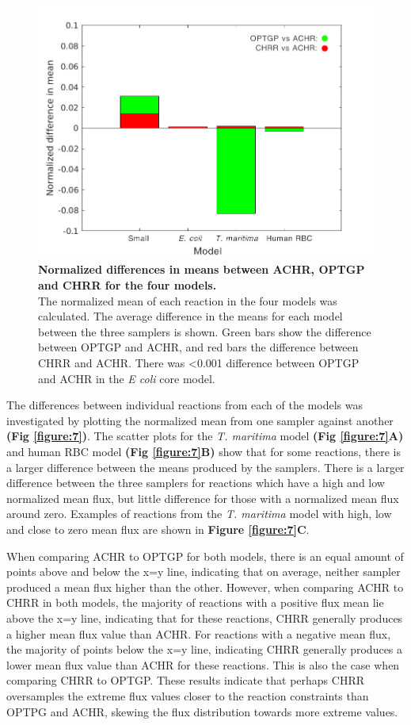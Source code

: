 \documentclass[10pt,letterpaper]{article}
\begin{document}
\begin{figure}[!h]
\centering
\includegraphics[scale=0.75]{fig6.png}
\caption{\textbf{Normalized differences in means between ACHR, OPTGP and CHRR for the four models.}\\
The normalized mean of each reaction in the four models was calculated. The average difference in the means for each model between the three samplers is shown. Green bars show the difference between OPTGP and ACHR, and red bars the difference between CHRR and ACHR. There was \textless{}0.001 difference between OPTGP and ACHR in the \textit{E coli} core model.
}
\label{figure:6}
\end{figure}

\pagebreak 
The differences between individual reactions from each of the models was investigated by plotting the normalized mean from one sampler against another \textbf{(Fig \ref{figure:7})}. The scatter plots for the \textit{T. maritima} model \textbf{(Fig \ref{figure:7}A)} and human RBC model \textbf{(Fig \ref{figure:7}B)} show that for some reactions, there is a larger difference between the means produced by the samplers. There is a larger difference between the three samplers for reactions which have a high and low normalized mean flux, but little difference for those with a normalized mean flux around zero. Examples of reactions from the \textit{T. maritima} model with high, low and close to zero mean flux are shown in \textbf{Figure \ref{figure:7}C}.

When comparing ACHR to OPTGP for both models, there is an equal amount of points above and below the x=y line, indicating that on average, neither sampler produced a mean flux higher than the other. However, when comparing ACHR to CHRR in both models, the majority of reactions with a positive flux mean lie above the x=y line, indicating that for these reactions, CHRR generally produces a higher mean flux value than ACHR. For reactions with a negative mean flux, the majority of points below the x=y line, indicating CHRR generally produces a lower mean flux value than ACHR for these reactions. This is also the case when comparing CHRR to OPTGP. These results indicate that perhaps CHRR oversamples the extreme flux values closer to the reaction constraints than OPTPG and ACHR, skewing the flux distribution towards more extreme values. 
\end{document}
